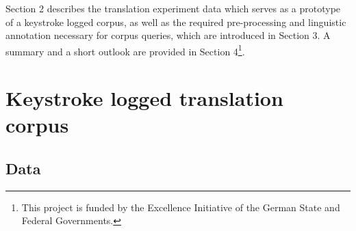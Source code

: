 \documentclass[output=paper]{LSP/langsci}
\begin{document}
Section 2 describes the translation experiment data which serves as a prototype of a keystroke logged corpus, as well as the required pre-processing and linguistic annotation necessary for corpus queries, which are introduced in Section 3. A summary and a short outlook are provided in Section 4\footnote{This project is funded by the Excellence Initiative of the German State and Federal Governments.}. 

\section{Keystroke logged translation corpus}
\subsection{Data}
\end{document}
